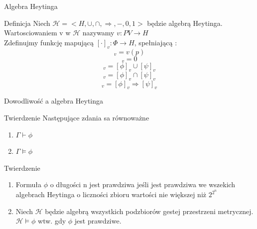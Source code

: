 \documentclass{beamer}
\begin{document}
\begin{frame}{Algebra Heytinga}
 \begin{block}{Definicja}
 Niech \( \mathcal{H} = < H, \cup, \cap, \Rightarrow, - , 0 ,1 >  \) będzie algebrą Heytinga.\\
  Wartosciowaniem v w \( \mathcal{H} \) nazywamy \( v : PV \rightarrow H\)\\
 Zdefinujmy funkcję mapującą  \( [ \cdot ]_v : \Phi \rightarrow H\), spełniającą :
 \begin{equation*}
 	[p]_v = v ( p)
 \end{equation*} 
 \begin{equation*}
 	[\bot]_v = 0
 \end{equation*} 
  \begin{equation*}
 	[\phi \vee \psi]_v = [\phi]_v \cup [\psi]_v
 \end{equation*}
  \begin{equation*}
 	[\phi \wedge \psi]_v = [\phi]_v \cap [\psi]_v 
 \end{equation*}
  \begin{equation*}
 	[\phi \rightarrow \psi]_v = [\phi]_v \Rightarrow [\psi]_v
 \end{equation*}
 \end{block}
\end{frame}

\begin{frame}{Dowodliwość a algebra Heytinga}
 \begin{block}{Twierdzenie}
Następujące zdania sa równoważne
	\begin{enumerate}
	\item \(\Gamma \vdash \phi\)
 	\item \(\Gamma \models \phi\) 

	\end{enumerate}
 \end{block}
 
 \begin{block}{Twierdzenie}
	\begin{enumerate}
	\item Formuła \(\phi\) o długości n jest prawdziwa jeśli jest prawdziwa we wszekich algebrach Heytinga o liczności zbioru wartości  nie większej niż \( 2 ^ {2 ^ n}\)
 	\item Niech \(\mathcal{H}\) będzie algebrą wszystkich podzbiorów gestej przestrzeni metrycznej. \( \mathcal{H} \models \phi\) wtw. gdy \(\phi\) jest prawdziwe.

	\end{enumerate}
 \end{block}
\end{frame}
\end{document}
